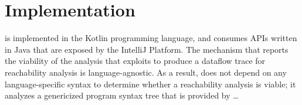 
\section{Implementation}
\label{sec:Impl}

\toolname{} is implemented in the Kotlin programming language, and consumes
\acp{API} written in Java that are exposed by the IntelliJ Platform.
The mechanism that reports the viability of the analysis that \toolname{}
exploits to produce a dataflow trace for reachability analysis is 
language-agnostic.
As a result, \toolname{} does not depend on any language-specific syntax to 
determine whether a reachability analysis is viable; it analyzes a genericized 
program syntax tree that is provided by  \dots

\endinput
